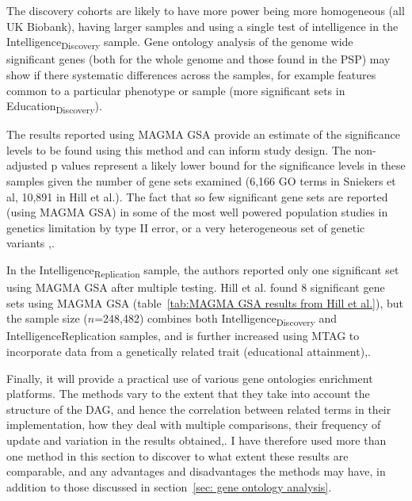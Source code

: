 The discovery cohorts are likely to have more power being more homogeneous (all UK Biobank), having larger samples and using a single test of intelligence in the Intelligence\textsubscript{Discovery} sample. Gene ontology analysis of the genome wide significant genes (both for the whole genome and those found in the PSP) may show if there systematic differences across the samples, for example features common to a particular phenotype or sample (more significant sets in Education\textsubscript{Discovery}).

The results reported using MAGMA GSA provide an estimate of the significance levels to be found using this method and can inform study design\cite{sniekers2017genome}\cite{hill2019combined}. The non-adjusted p values represent a likely lower bound for the significance levels in these samples given the number of gene sets examined (6,166 GO terms in Sniekers et al\cite{sniekers2017genome}, 10,891 in Hill et al.\cite{hill2019combined}). The fact that so few significant gene sets are reported (using MAGMA GSA) in some of the most well powered  population studies  in genetics limitation by type II error, or a very heterogeneous set of genetic variants \cite{sniekers2017genome},\cite{hill2019combined}. 

In the Intelligence\textsubscript{Replication} sample, the authors reported only one significant set using MAGMA GSA after multiple testing\cite{sniekers2017genome}. Hill et al. found 8 significant gene sets using MAGMA GSA (table~\ref{tab:MAGMA GSA results from Hill et al.}), but the sample size ($n$=248,482)  combines both Intelligence\textsubscript{Discovery} and Intelligence{Replication} samples, and is further increased using MTAG to incorporate data from a genetically related trait (educational attainment)\cite{hill2019combined},\cite{turley2018multi}.



Finally, it will provide a practical use of various gene ontologies enrichment platforms. The methods vary to the extent that they take into account the structure of the DAG, and hence the correlation between related terms in their implementation, how they deal with multiple comparisons, their frequency of update and variation in the results obtained\cite{khatri2005ontological},\cite{rhee2008use}.  I have therefore used more than one method in this section to discover to what extent these results are comparable, and any advantages and disadvantages the methods may have, in addition to those discussed in section~\ref{sec: gene ontology analysis}.

